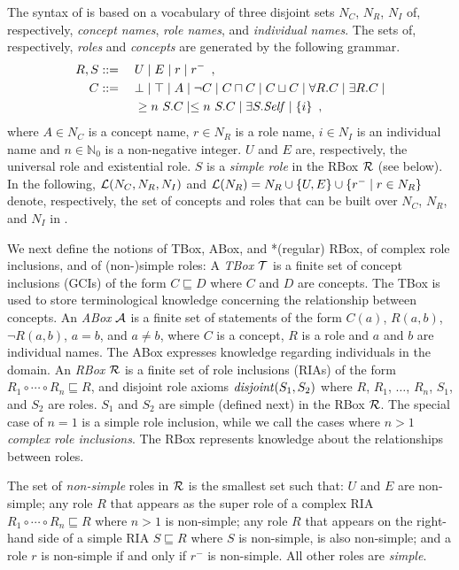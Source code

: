 \documentclass[
]{ceurart}
\begin{document}
The syntax of \SROIQ is based on a vocabulary of three disjoint sets $N_C$, $N_R$, $N_I$ of, respectively, \emph{concept names}, \emph{role names}, and \emph{individual names}. The sets of, respectively, \SROIQ  \emph{roles} and \SROIQ \emph{concepts} are generated by the following grammar.
\begin{alignat*}{2}
  R, S &::={} && U \mid E \mid r \mid r^{-} \enspace,\\
  C &::= && \bot \mid \top \mid A \mid \neg C \mid C \sqcap C \mid C \sqcup C \mid \forall R.C \mid \exists R.C \mid \\ 
  &&& \geq n~S.C \mid \leq n~S.C \mid \exists S.\mathit{Self} \mid \{i\} \enspace,
\end{alignat*}
where $A \in N_C$ is a concept name, $r \in N_R$ is a role name, $i \in N_I$ is an individual name and $n \in \mathbb{N}_0$ is a non-negative integer. 
%
$U$ and $E$ are, respectively, the universal role and existential role. $S$ is a \emph{simple role} in the RBox $\mathcal{R}$ (see below). In the following, $\mathcal{L}(N_C, N_R, N_I)$ and $\mathcal{L}(N_R) = N_R \cup \{U, E\} \cup \{r^- \mid r \in N_R\}$ denote, respectively, the set of concepts and roles that can be built over $N_C$, $N_R$, and $N_I$ in \SROIQ.

We next define the notions of TBox, ABox, and *(regular) RBox, of complex role inclusions, and of (non-)simple roles:
A \emph{TBox} $\mathcal{T}$ is a finite set of concept inclusions (GCIs) of the form $C \sqsubseteq D$ where $C$ and $D$ are concepts. The TBox is used to store terminological knowledge concerning the relationship between concepts. 
%
An \emph{ABox} $\mathcal{A}$ is a finite set of statements of the form $C(a)$, $R(a,b)$, $\lnot R (a,b)$, $a = b$, and $a \not= b$, where $C$ is a concept, $R$ is a role and $a$ and $b$ are individual names. The ABox expresses knowledge regarding individuals in the domain. 
%
An \emph{RBox} $\mathcal{R}$ is a finite set of role inclusions (RIAs) of the form $R_1 \circ \cdots \circ R_n \sqsubseteq R$, and disjoint role axioms $\mathit{disjoint}(S_1, S_2)$ where $R$, $R_1$, $\dots$, $R_n$, $S_1$, and $S_2$ are roles. $S_1$ and $S_2$ are simple (defined next) in the RBox $\mathcal{R}$. The special case of $n = 1$ is a simple role inclusion, while we call the cases where $n > 1$ \emph{complex role inclusions}. The RBox represents knowledge about the relationships between roles.

The set of \emph{non-simple} roles in $\mathcal{R}$ is the smallest set such that: $U$ and $E$ are non-simple; any role $R$ that appears as the super role of a complex RIA $R_1 \circ \cdots \circ R_n \sqsubseteq R$ where $n > 1$ is non-simple; any role $R$ that appears on the right-hand side of a simple RIA $S \sqsubseteq R$ where $S$ is non-simple, is also non-simple; and a role $r$ is non-simple if and only if $r^-$ is non-simple.
All other roles are \emph{simple}.
\end{document}
